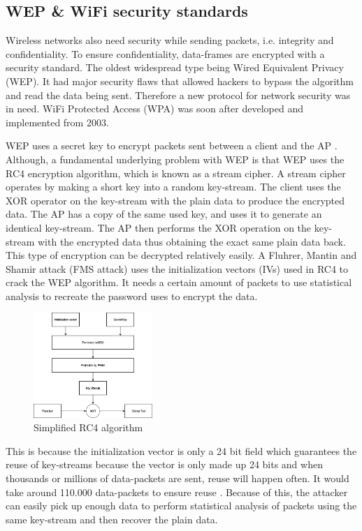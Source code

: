 \subsection{WEP \& WiFi security standards}
Wireless networks also need security while sending packets, i.e. integrity and confidentiality. To ensure confidentiality, data-frames are encrypted with a security standard. The oldest widespread type being Wired Equivalent Privacy (WEP). It had major security flaws that allowed hackers to bypass the algorithm and read the data being sent\cite{WEP1}. Therefore a new protocol for network security was in need. WiFi Protected Access (WPA) was soon after developed and implemented from 2003\cite{WEP3}. 

WEP uses a secret key to encrypt packets sent between a client and the AP \cite{WEP2}. Although, a fundamental underlying problem with WEP is that WEP uses the RC4 encryption algorithm, which is known as a stream cipher. A stream cipher operates by making a short key into a random key-stream. The client uses the XOR operator on the key-stream with the plain data to produce the encrypted data. The AP has a copy of the same used key, and uses it to generate an identical key-stream. The AP then performs the XOR operation on the key-stream with the encrypted data thus obtaining the exact same plain data back. This type of encryption can be decrypted relatively easily. A Fluhrer, Mantin and Shamir attack (FMS attack) uses the initialization vectors (IVs) used in RC4 to crack the WEP algorithm. It needs a certain amount of packets to use statistical analysis to recreate the password uses to encrypt the data.

\begin{figure}[!htbp]
    \centering
    \includegraphics[width=0.4\textwidth]{Latex-Files/Billeder/RC4.png}
    \caption{Simplified RC4 algorithm \cite{geeks}}
    \label{RC4}
\end{figure}

This is because the initialization vector is only a 24 bit field which guarantees the reuse of key-streams because the vector is only made up 24 bits and when thousands or millions of data-packets are sent, reuse will happen often. It would take around 110.000 data-packets to ensure reuse \cite{Random_map}. Because of this, the attacker can easily pick up enough data to perform statistical analysis of packets using the same key-stream and then recover the plain data.

